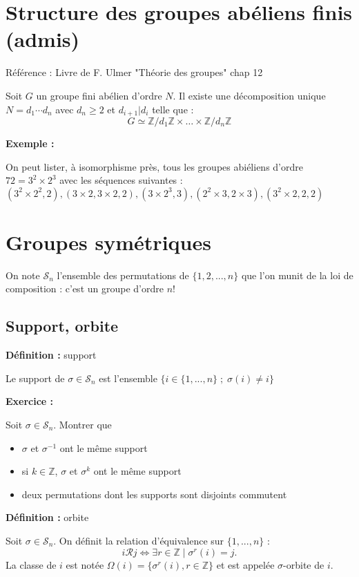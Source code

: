 \documentclass{report}
\newenvironment{definition}[1][]{
    \begin{tcolorbox}[colframe= white]
    \textbf{Définition :} 
    #1 \par
    }
    {\end{tcolorbox}}
\newenvironment{exemple}{\begin{tcolorbox}[colframe= white]
    \textbf{Exemple :}
     \par}
    {\end{tcolorbox}}
\newenvironment{exo}{\begin{tcolorbox}[colframe= white]
    \textbf{Exercice :}
    \par}
    {\end{tcolorbox}}
\newcommand{\Z}{\mathbb{Z}}
\newcommand{\sn}{\mathcal{S}_{n}}
\newcommand{\unn}{\{1, ..., n\}}
\begin{document}
\section{Structure des groupes abéliens finis (admis)}
Référence : Livre de F. Ulmer "Théorie des groupes" chap 12


Soit $G$ un groupe fini abélien d'ordre $N$. Il existe une décomposition unique $N=d_1 \cdots d_n$ avec $d_n \geq 2$ et $d_{i+1} | d_i$ telle que : $$G \simeq \mathbb{Z}/d_1\mathbb{Z} \times \dots \times \mathbb{Z}/d_n\mathbb{Z}$$

\begin{exemple}
	On peut lister, à isomorphisme près, tous les groupes abiéliens d'ordre $72=3^2 \times 2^3$ avec les séquences suivantes : $(3^2 \times 2^2, 2) , (3\times 2, 3\times 2, 2), (3\times 2^3, 3), (2^2\times 3, 2\times 3), (3^2\times 2,2,2)$
\end{exemple}

\section{Groupes symétriques}
On note $\sn$  l'ensemble des permutations de $\{1, 2, ..., n\}$ que l'on munit de la loi de composition : c'est un groupe d'ordre $n!$

\subsection{Support, orbite}
\begin{definition}[support]
Le support de $\sigma \in \sn$ est l'ensemble $\{i\in\unn\; ; \; \sigma(i)\neq i\}$
\end{definition}

\begin{exo}
Soit $\sigma\in\sn$. Montrer que
\begin{itemize}[label=$\bullet$]
\item $\sigma$ et $\sigma^{-1}$ ont le même support
\item si $k\in\Z$, $\sigma$ et $\sigma^k$ ont le même support
\item deux permutations dont les supports sont disjoints commutent
\end{itemize}
\end{exo}

\begin{definition}[orbite]
Soit $\sigma\in\sn$. On définit la relation d'équivalence sur $\unn$ : \[i\mathcal{R}j \Longleftrightarrow \exists r\in\Z \;|\;\sigma^r(i)=j.\]
La classe de $i$ est notée $\Omega(i) = \{\sigma^r(i), r\in\Z\}$ et est appelée $\sigma$-orbite de $i$.
\end{definition}
\end{document}
